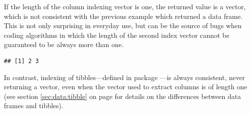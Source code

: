 \documentclass[krantz2]{krantz}\usepackage{knitr}
\begin{document}
\begin{explainbox}
If the length of the column indexing vector is one, the returned value is a vector, which is not consistent with the previous example which returned a data frame. This is not only surprising in everyday use, but can be the source of bugs when coding algorithms in which the length of the second index vector cannot be guaranteed to be always more than one.

\begin{knitrout}\footnotesize
{}\color{fgcolor}\begin{kframe}
\begin{alltt}
\hlstd{a.df[}\hlopt{:}\hlstd{,} \hlstd{]}
\end{alltt}
\begin{verbatim}
## [1] 2 3
\end{verbatim}
\end{kframe}
\end{knitrout}

In contrast, indexing of tibbles---defined in package ---is always consistent, never returning a vector, even when the vector used to extract columns is of length one (see section \ref{sec:data:tibble} on page \pageref{sec:data:tibble} for details on the differences between data frames and tibbles).
\end{explainbox}
\end{document}
